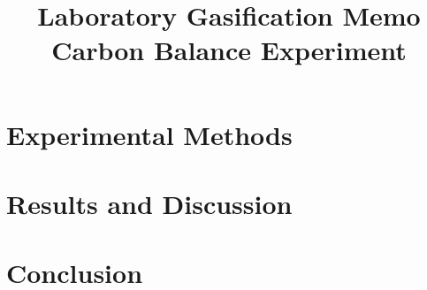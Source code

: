 \documentclass[11pt,twocolumn]{article}
\date{}
\title{Laboratory Gasification Memo\\Carbon Balance Experiment \vspace{-6ex}}
\begin{document}
\twocolumn[
  \begin{@twocolumnfalse}
    \maketitle
    \begin{abstract}
    


    \end{abstract}
  \end{@twocolumnfalse}
]

\section*{Experimental Methods}



\section*{Results and Discussion}



\section*{Conclusion}



\newpage
\appendix
\onecolumn
\end{document}
